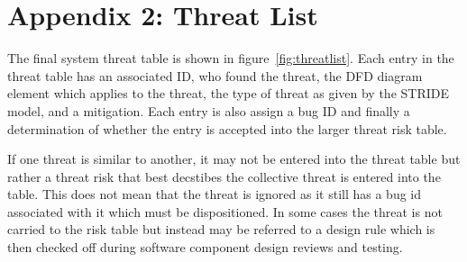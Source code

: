 \cleardoublepage
\chapter{Appendix 2: Threat List}
\label{ch:threatlist}

The final system threat table is shown in figure~\ref{fig:threatlist}.  Each entry in the threat table has an associated ID, who found the threat, the DFD diagram element which applies to the threat, the type of threat as given by the STRIDE model, and a mitigation.  Each entry is also assign a bug ID and finally a determination of whether the entry is accepted into the larger threat risk table.  
\par
If one threat is similar to another, it may not be entered into the threat table but rather a threat risk that best decstibes the collective threat is entered into the table.  This does not mean that the threat is ignored as it still has a bug id associated with it which must be dispositioned.  In some cases the threat is not carried to the risk table but instead may be referred to a design rule which is then checked off during software component design reviews and testing.


